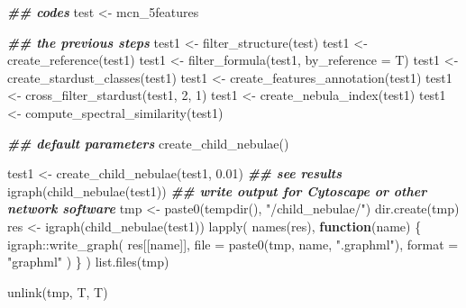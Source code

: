 \documentclass[
]{article}
\newenvironment{Shaded}{\begin{snugshade}}{\end{snugshade}}
\newcommand{\AttributeTok}[1]{\textcolor[rgb]{0.77,0.63,0.00}{#1}}
\newcommand{\ControlFlowTok}[1]{\textcolor[rgb]{0.13,0.29,0.53}{\textbf{#1}}}
\newcommand{\DecValTok}[1]{\textcolor[rgb]{0.00,0.00,0.81}{#1}}
\newcommand{\DocumentationTok}[1]{\textcolor[rgb]{0.56,0.35,0.01}{\textbf{\textit{#1}}}}
\newcommand{\FloatTok}[1]{\textcolor[rgb]{0.00,0.00,0.81}{#1}}
\newcommand{\FunctionTok}[1]{\textcolor[rgb]{0.00,0.00,0.00}{#1}}
\newcommand{\NormalTok}[1]{#1}
\newcommand{\OtherTok}[1]{\textcolor[rgb]{0.56,0.35,0.01}{#1}}
\newcommand{\SpecialCharTok}[1]{\textcolor[rgb]{0.00,0.00,0.00}{#1}}
\newcommand{\StringTok}[1]{\textcolor[rgb]{0.31,0.60,0.02}{#1}}
\begin{document}
\begin{Shaded}
\begin{Highlighting}[]
\DocumentationTok{\#\# codes}
\NormalTok{test }\OtherTok{\textless{}{-}}\NormalTok{ mcn\_5features}

\DocumentationTok{\#\# the previous steps}
\NormalTok{test1 }\OtherTok{\textless{}{-}} \FunctionTok{filter\_structure}\NormalTok{(test)}
\NormalTok{test1 }\OtherTok{\textless{}{-}} \FunctionTok{create\_reference}\NormalTok{(test1)}
\NormalTok{test1 }\OtherTok{\textless{}{-}} \FunctionTok{filter\_formula}\NormalTok{(test1, }\AttributeTok{by\_reference =}\NormalTok{ T)}
\NormalTok{test1 }\OtherTok{\textless{}{-}} \FunctionTok{create\_stardust\_classes}\NormalTok{(test1)}
\NormalTok{test1 }\OtherTok{\textless{}{-}} \FunctionTok{create\_features\_annotation}\NormalTok{(test1)}
\NormalTok{test1 }\OtherTok{\textless{}{-}} \FunctionTok{cross\_filter\_stardust}\NormalTok{(test1, }\DecValTok{2}\NormalTok{, }\DecValTok{1}\NormalTok{)}
\NormalTok{test1 }\OtherTok{\textless{}{-}} \FunctionTok{create\_nebula\_index}\NormalTok{(test1)}
\NormalTok{test1 }\OtherTok{\textless{}{-}} \FunctionTok{compute\_spectral\_similarity}\NormalTok{(test1)}

\DocumentationTok{\#\# default parameters}
\FunctionTok{create\_child\_nebulae}\NormalTok{()}

\NormalTok{test1 }\OtherTok{\textless{}{-}} \FunctionTok{create\_child\_nebulae}\NormalTok{(test1, }\FloatTok{0.01}\NormalTok{)}
\DocumentationTok{\#\# see results}
\FunctionTok{igraph}\NormalTok{(}\FunctionTok{child\_nebulae}\NormalTok{(test1))}
\DocumentationTok{\#\# write output for \textquotesingle{}Cytoscape\textquotesingle{} or other network software}
\NormalTok{tmp }\OtherTok{\textless{}{-}} \FunctionTok{paste0}\NormalTok{(}\FunctionTok{tempdir}\NormalTok{(), }\StringTok{"/child\_nebulae/"}\NormalTok{)}
\FunctionTok{dir.create}\NormalTok{(tmp)}
\NormalTok{res }\OtherTok{\textless{}{-}} \FunctionTok{igraph}\NormalTok{(}\FunctionTok{child\_nebulae}\NormalTok{(test1))}
\FunctionTok{lapply}\NormalTok{(}
  \FunctionTok{names}\NormalTok{(res),}
  \ControlFlowTok{function}\NormalTok{(name) \{}
\NormalTok{    igraph}\SpecialCharTok{::}\FunctionTok{write\_graph}\NormalTok{(}
\NormalTok{      res[[name]],}
      \AttributeTok{file =} \FunctionTok{paste0}\NormalTok{(tmp, name, }\StringTok{".graphml"}\NormalTok{),}
      \AttributeTok{format =} \StringTok{"graphml"}
\NormalTok{    )}
\NormalTok{  \}}
\NormalTok{)}
\FunctionTok{list.files}\NormalTok{(tmp)}

\FunctionTok{unlink}\NormalTok{(tmp, T, T)}
\end{Highlighting}
\end{Shaded}
\end{document}
